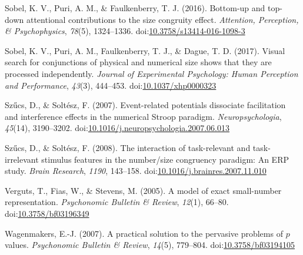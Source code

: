 \documentclass[english,man]{apa6}
\theoremstyle{definition}
\theoremstyle{definition}
\theoremstyle{definition}
\theoremstyle{remark}
\begin{document}
\hypertarget{ref-sobel2016}{}
Sobel, K. V., Puri, A. M., \& Faulkenberry, T. J. (2016). Bottom-up and
top-down attentional contributions to the size congruity effect.
\emph{Attention, Perception, \& Psychophysics}, \emph{78}(5),
1324--1336.
doi:\href{https://doi.org/10.3758/s13414-016-1098-3}{10.3758/s13414-016-1098-3}

\hypertarget{ref-sobel2017}{}
Sobel, K. V., Puri, A. M., Faulkenberry, T. J., \& Dague, T. D. (2017).
Visual search for conjunctions of physical and numerical size shows that
they are processed independently. \emph{Journal of Experimental
Psychology: Human Perception and Performance}, \emph{43}(3), 444--453.
doi:\href{https://doi.org/10.1037/xhp0000323}{10.1037/xhp0000323}

\hypertarget{ref-szucs2007}{}
Szűcs, D., \& Soltész, F. (2007). Event-related potentials dissociate
facilitation and interference effects in the numerical Stroop paradigm.
\emph{Neuropsychologia}, \emph{45}(14), 3190--3202.
doi:\href{https://doi.org/10.1016/j.neuropsychologia.2007.06.013}{10.1016/j.neuropsychologia.2007.06.013}

\hypertarget{ref-szucs2008}{}
Szűcs, D., \& Soltész, F. (2008). The interaction of task-relevant and
task-irrelevant stimulus features in the number/size congruency
paradigm: An ERP study. \emph{Brain Research}, \emph{1190}, 143--158.
doi:\href{https://doi.org/10.1016/j.brainres.2007.11.010}{10.1016/j.brainres.2007.11.010}

\hypertarget{ref-verguts2005}{}
Verguts, T., Fias, W., \& Stevens, M. (2005). A model of exact
small-number representation. \emph{Psychonomic Bulletin \& Review},
\emph{12}(1), 66--80.
doi:\href{https://doi.org/10.3758/bf03196349}{10.3758/bf03196349}

\hypertarget{ref-wagenmakers2007}{}
Wagenmakers, E.-J. (2007). A practical solution to the pervasive
problems of \(p\) values. \emph{Psychonomic Bulletin \& Review},
\emph{14}(5), 779--804.
doi:\href{https://doi.org/10.3758/bf03194105}{10.3758/bf03194105}
\end{document}
